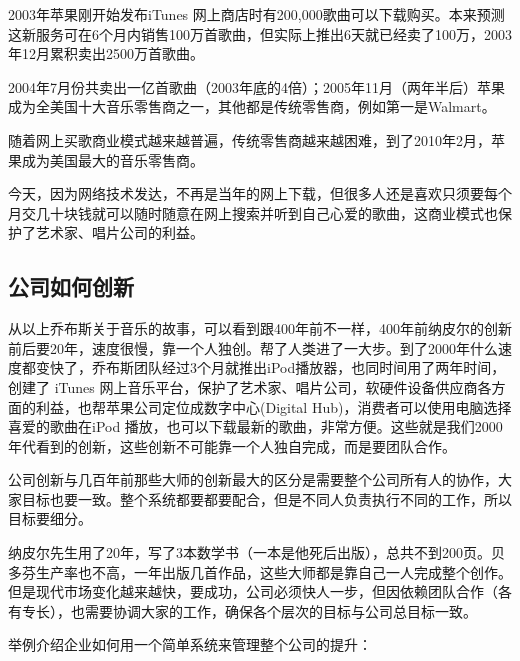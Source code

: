 2003年苹果刚开始发布iTunes 网上商店时有200,000歌曲可以下载购买。本来预测这新服务可在6个月内销售100万首歌曲，但实际上推出6天就已经卖了100万，2003年12月累积卖出2500万首歌曲。

2004年7月份共卖出一亿首歌曲（2003年底的4倍）；2005年11月（两年半后）苹果成为全美国十大音乐零售商之一，其他都是传统零售商，例如第一是Walmart。

随着网上买歌商业模式越来越普遍，传统零售商越来越困难，到了2010年2月，苹果成为美国最大的音乐零售商。

今天，因为网络技术发达，不再是当年的网上下载，但很多人还是喜欢只须要每个月交几十块钱就可以随时随意在网上搜索并听到自己心爱的歌曲，这商业模式也保护了艺术家、唱片公司的利益。

\hypertarget{ux516cux53f8ux5982ux4f55ux521bux65b0-1}{%
\subsection{公司如何创新}\label{ux516cux53f8ux5982ux4f55ux521bux65b0-1}}

从以上乔布斯关于音乐的故事，可以看到跟400年前不一样，400年前纳皮尔的创新前后要20年，速度很慢，靠一个人独创。帮了人类进了一大步。到了2000年什么速度都变快了，乔布斯团队经过3个月就推出iPod播放器，也同时间用了两年时间，创建了 iTunes 网上音乐平台，保护了艺术家、唱片公司，软硬件设备供应商各方面的利益，也帮苹果公司定位成数字中心(Digital Hub)，消费者可以使用电脑选择喜爱的歌曲在iPod 播放，也可以下载最新的歌曲，非常方便。这些就是我们2000年代看到的创新，这些创新不可能靠一个人独自完成，而是要团队合作。

公司创新与几百年前那些大师的创新最大的区分是需要整个公司所有人的协作，大家目标也要一致。整个系统都要都要配合，但是不同人负责执行不同的工作，所以目标要细分。

纳皮尔先生用了20年，写了3本数学书（一本是他死后出版），总共不到200页。贝多芬生产率也不高，一年出版几首作品，这些大师都是靠自己一人完成整个创作。但是现代市场变化越来越快，要成功，公司必须快人一步，但因依赖团队合作（各有专长），也需要协调大家的工作，确保各个层次的目标与公司总目标一致。

举例介绍企业如何用一个简单系统来管理整个公司的提升：

